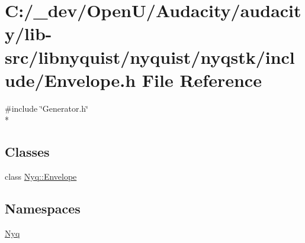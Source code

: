 \hypertarget{lib-src_2libnyquist_2nyquist_2nyqstk_2include_2_envelope_8h}{}\section{C\+:/\+\_\+dev/\+Open\+U/\+Audacity/audacity/lib-\/src/libnyquist/nyquist/nyqstk/include/\+Envelope.h File Reference}
\label{lib-src_2libnyquist_2nyquist_2nyqstk_2include_2_envelope_8h}
{\ttfamily \#include \char`\"{}Generator.\+h\char`\"{}}\\*
\subsection*{Classes}
\begin{DoxyCompactItemize}
\item 
class \hyperlink{class_nyq_1_1_envelope}{Nyq\+::\+Envelope}
\end{DoxyCompactItemize}
\subsection*{Namespaces}
\begin{DoxyCompactItemize}
\item 
 \hyperlink{namespace_nyq}{Nyq}
\end{DoxyCompactItemize}
